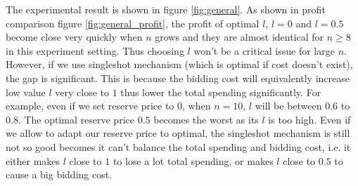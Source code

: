 The experimental result is shown in figure \ref{fig:general}. As shown in
profit comparison figure \ref{fig:general_profit}, the profit of optimal $l$,
$l = 0$ and $l = 0.5$ become close very quickly when $n$ grows and they are
almost identical for $n \geq 8$ in this experiment setting. Thus choosing $l$
won't be a critical issue for large $n$. However, if we use singleshot
mechanism (which is optimal if cost doesn't exist), the gap is significant.
This is because the bidding cost will equivalently increase low value $l$ very
close to $1$ thus lower the total spending significantly. For example, even if
we set reserve price to $0$, when $n = 10$, $l$ will be between $0.6$ to $0.8$.
The optimal reserve price $0.5$ becomes the worst as its $l$ is too high. Even
if we allow to adapt our reserve price to optimal, the singleshot mechanism is
still not so good becomes it can't balance the total spending and bidding cost,
i.e. it either makes $l$ close to $1$ to lose a lot total spending, or makes
$l$ close to $0.5$ to cause a big bidding cost.
